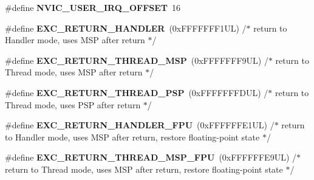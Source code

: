 \begin{DoxyCompactItemize}
\mbox{\label{group___c_m_s_i_s___core___n_v_i_c_functions_ga8045d905a5ca57437d8e6f71ffcb6df5}} 
\#define {\bfseries N\+V\+I\+C\+\_\+\+U\+S\+E\+R\+\_\+\+I\+R\+Q\+\_\+\+O\+F\+F\+S\+ET}~16
\item 
\mbox{\label{group___c_m_s_i_s___core___n_v_i_c_functions_gaa6fa2b10f756385433e08522d9e4632f}} 
\#define {\bfseries E\+X\+C\+\_\+\+R\+E\+T\+U\+R\+N\+\_\+\+H\+A\+N\+D\+L\+ER}~(0x\+F\+F\+F\+F\+F\+F\+F1\+U\+L)     /$\ast$ return to Handler mode, uses M\+S\+P after return                               $\ast$/
\item 
\mbox{\label{group___c_m_s_i_s___core___n_v_i_c_functions_gaea4703101b5e679f695e231f7ee72331}} 
\#define {\bfseries E\+X\+C\+\_\+\+R\+E\+T\+U\+R\+N\+\_\+\+T\+H\+R\+E\+A\+D\+\_\+\+M\+SP}~(0x\+F\+F\+F\+F\+F\+F\+F9\+U\+L)     /$\ast$ return to Thread mode, uses M\+S\+P after return                                $\ast$/
\item 
\mbox{\label{group___c_m_s_i_s___core___n_v_i_c_functions_ga9998daf0fbdf31dbc8f81cd604b58175}} 
\#define {\bfseries E\+X\+C\+\_\+\+R\+E\+T\+U\+R\+N\+\_\+\+T\+H\+R\+E\+A\+D\+\_\+\+P\+SP}~(0x\+F\+F\+F\+F\+F\+F\+F\+D\+U\+L)     /$\ast$ return to Thread mode, uses P\+S\+P after return                                $\ast$/
\item 
\mbox{\label{group___c_m_s_i_s___core___n_v_i_c_functions_ga3aa6648e1c3c09fbab1f543b9dcffc3a}} 
\#define {\bfseries E\+X\+C\+\_\+\+R\+E\+T\+U\+R\+N\+\_\+\+H\+A\+N\+D\+L\+E\+R\+\_\+\+F\+PU}~(0x\+F\+F\+F\+F\+F\+F\+E1\+U\+L)     /$\ast$ return to Handler mode, uses M\+S\+P after return, restore floating-\/point state $\ast$/
\item 
\mbox{\label{group___c_m_s_i_s___core___n_v_i_c_functions_gaad4cb3b34fd4264ccfae1fbbc75a3431}} 
\#define {\bfseries E\+X\+C\+\_\+\+R\+E\+T\+U\+R\+N\+\_\+\+T\+H\+R\+E\+A\+D\+\_\+\+M\+S\+P\+\_\+\+F\+PU}~(0x\+F\+F\+F\+F\+F\+F\+E9\+U\+L)     /$\ast$ return to Thread mode, uses M\+S\+P after return, restore floating-\/point state  $\ast$/
\item 

\end{DoxyCompactItemize}
